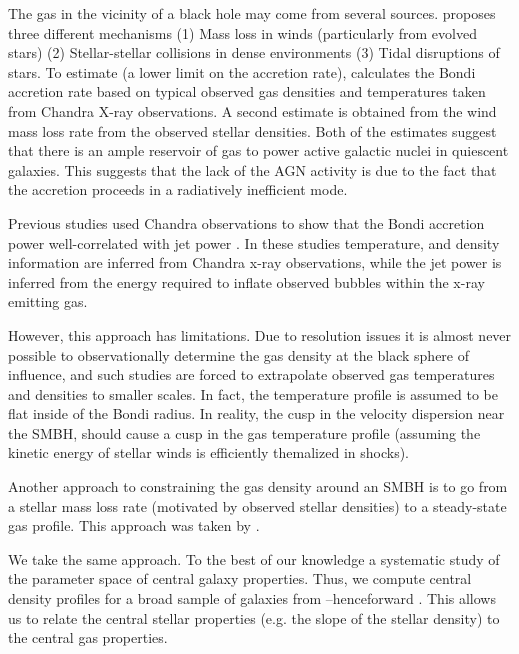 \documentclass[usenatbib,fleqn]{mn2e}
\begin{document}
The gas in the vicinity of a black hole may come from several
sources. \citealt{Ho:2009a} proposes three different mechanisms (1)
Mass loss in winds (particularly from evolved stars) (2)
Stellar-stellar collisions in dense environments (3) Tidal disruptions
of stars. To estimate (a lower limit on the accretion rate),
\citealt{Ho:2009a} calculates the Bondi accretion rate based on
typical observed gas densities and temperatures taken from Chandra
X-ray observations. A second estimate is obtained from the wind mass
loss rate from the observed stellar densities. Both of the estimates
suggest that there is an ample reservoir of gas to power active
galactic nuclei in quiescent galaxies. This suggests that the lack of
the AGN activity is due to the fact that the accretion proceeds in a
radiatively inefficient mode.

Previous studies used Chandra observations to show that the Bondi
accretion power well-correlated with jet power
\citep{AllenDunn+:2006a,FujitaKawakatu+:2014a}. In these studies
temperature, and density information are inferred from Chandra x-ray
observations, while the jet power is inferred from the energy required
to inflate observed bubbles within the x-ray emitting gas.

However, this approach has limitations. Due to resolution issues it is
almost never possible to observationally determine the gas density at
the black sphere of influence, and such studies are forced to
extrapolate observed gas temperatures and densities to smaller scales.
In fact, the temperature profile is assumed to be flat inside of the
Bondi radius.  In reality, the cusp in the velocity dispersion near
the SMBH, should cause a cusp in the gas temperature profile (assuming
the kinetic energy of stellar winds is efficiently themalized in
shocks).

Another approach to constraining the gas density around an SMBH is to
go from a stellar mass loss rate (motivated by observed stellar
densities) to a steady-state gas profile. This approach was taken by
\citealt{Quataert:2004a,De-ColleGuillochon+:2012a,ShcherbakovWong+:2014a}.

We take the same approach. To the best of our knowledge a systematic
study of the parameter space of central galaxy properties. Thus, we
compute central density profiles for a broad sample of galaxies from
\citealt{WangMerritt:2004a}--henceforward
.  This allows us to relate the central
stellar properties (e.g. the slope of the stellar density) to the
central gas properties.
\end{document}
